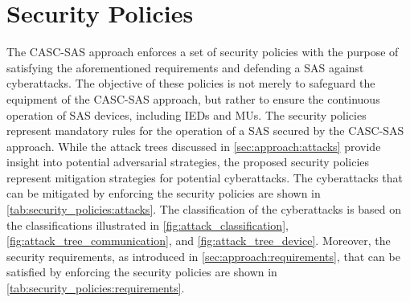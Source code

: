 \section{Security Policies}
\label{sec:approach:security_policies}
The CASC-SAS approach enforces a set of security policies with the purpose of satisfying the aforementioned requirements and defending a SAS against cyberattacks.
The objective of these policies is not merely to safeguard the equipment of the CASC-SAS approach, but rather to ensure the continuous operation of SAS devices, including IEDs and MUs.
The security policies represent mandatory rules for the operation of a SAS secured by the CASC-SAS approach.
While the attack trees discussed in \autoref{sec:approach:attacks} provide insight into potential adversarial strategies, the proposed security policies represent mitigation strategies for potential cyberattacks.
The cyberattacks that can be mitigated by enforcing the security policies are shown in \autoref{tab:security_policies:attacks}.
The classification of the cyberattacks is based on the classifications illustrated in \autoref{fig:attack_classification}, \autoref{fig:attack_tree_communication}, and \autoref{fig:attack_tree_device}.
Moreover, the security requirements, as introduced in \autoref{sec:approach:requirements}, that can be satisfied by enforcing the security policies are shown in \autoref{tab:security_policies:requirements}.

